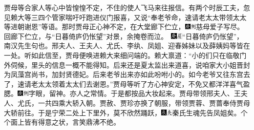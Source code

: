 贾母等合家人等心中皆惶惶不定，不住的使人飞马来往报信。有两个时辰工夫，忽见赖大等三四个管家喘吁吁跑进仪门报喜，又说``奉老爷命，速请老太太带领太太等进朝谢恩''等语。那时贾母正心神不定，在大堂廊下伫立，{\includegraphics[width=3mm]{../Images/00004}\includegraphics[width=3mm]{../Images/00011}\footnotesize \kaishu 慈母爱子写尽。回廊下伫立，与``日暮倚庐仍怅望''对景，余掩卷而泣。　\includegraphics[width=3mm]{../Images/00004}\includegraphics[width=3mm]{../Images/00010}\footnotesize \kaishu ``日暮倚庐仍怅望''，南汉先生句也。}邢夫人、王夫人、尤氏、李纨、凤姐、迎春姊妹以及薛姨妈等皆在一处。听如此信至，贾母便唤进赖大来细问端的。赖大禀道：``小的们只在临敬门外伺候，里头的信息一概不能得知。后来还是夏太监出来道喜，说咱家大小姐晋封为凤藻宫尚书，加封贤德妃。后来老爷出来亦如此吩咐小的。如今老爷又往东宫去了，速请老太太领着太太们去谢恩。''贾母等听了方心神安定，不免又都洋洋喜气盈腮。{\includegraphics[width=3mm]{../Images/00004}\includegraphics[width=3mm]{../Images/00011}\footnotesize \kaishu 字眼，留神。亦人之常情。}于是都按品大妆起来。贾母带领邢夫人、王夫人、尤氏，一共四乘大轿入朝。贾赦、贾珍亦换了朝服，带领贾蓉、贾蔷奉侍贾母大轿前往。于是宁荣二处上下里外，莫不欣然踊跃，{\includegraphics[width=3mm]{../Images/00009}\includegraphics[width=3mm]{../Images/00012}\footnotesize \kaishu 秦氏生魂先告凤姐矣。}个个面上皆有得意之状，言笑鼎沸不绝。

